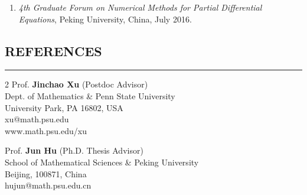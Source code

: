 \documentclass[10pt,a4]{article}
\begin{document}
\begin{small}
\begin{enumerate}
    \item  
       {\it 4th Graduate Forum on Numerical Methods for Partial Differential Equations}, Peking University, China, July 2016. 
   
\end{enumerate}
 
 


\vspace{0.1cm}

\subsection*{REFERENCES}
\hrule
\vspace{0.2cm}
 
\begin{footnotesize}

\begin{multicols}{2} 
\noindent 
Prof. \textbf{Jinchao Xu} (Postdoc Advisor) \\ 
Dept. of Mathematics \& Penn State University\\
University Park, PA 16802, USA\\
xu@math.psu.edu \\
www.math.psu.edu/xu\\

\columnbreak

\noindent
Prof. \textbf{Jun Hu} (Ph.D. Thesis Advisor)\\ 
School of Mathematical Sciences \& Peking University \\
Beijing, 100871, China \\  
hujun@math.psu.edu.cn \\


\end{multicols}

\end{footnotesize}
\end{small}
\end{document}
